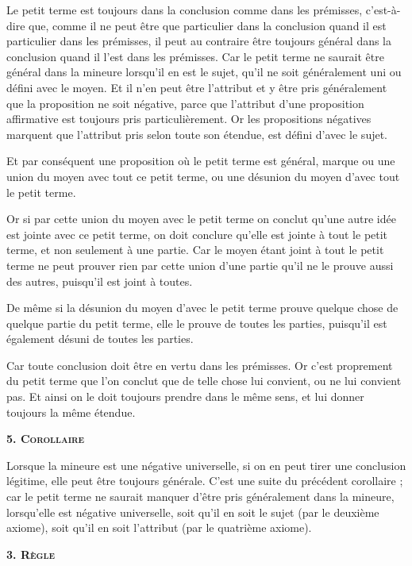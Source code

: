 	Le petit terme est toujours dans la conclusion comme dans les prémisses, c'est-à-dire que, comme il ne peut être que particulier dans la conclusion quand il est particulier dans les prémisses, il peut au contraire être toujours général dans la conclusion quand il l'est dans les prémisses.
	Car le petit terme ne saurait être général dans la mineure lorsqu'il en est le sujet, qu'il ne soit généralement uni ou défini avec le moyen. Et il n'en peut être l'attribut et y être pris généralement que la proposition ne soit négative, parce que l'attribut d'une proposition affirmative est toujours pris particulièrement. Or les propositions négatives marquent que l'attribut pris selon toute son étendue, est défini d'avec le sujet.

	Et par conséquent une proposition où le petit terme est général, marque ou une union du moyen avec tout ce petit terme, ou une désunion du moyen d'avec tout le petit terme.

	Or si par cette union du moyen avec le petit terme on conclut qu'une autre idée est jointe avec ce petit terme, on doit conclure qu'elle est jointe à tout le petit terme, et non seulement à une partie. Car le moyen étant joint à tout le petit terme ne peut prouver rien par cette union d'une partie qu'il ne le prouve aussi des autres, puisqu'il est joint à toutes.

	De même si la désunion du moyen d'avec le petit terme prouve quelque chose de quelque partie du petit terme, elle le prouve de toutes les parties, puisqu'il est également désuni de toutes les parties.

	Car toute conclusion doit être en vertu dans les prémisses. Or c'est proprement du petit terme que l'on conclut que de telle chose lui convient, ou ne lui convient pas. Et ainsi on le doit toujours prendre dans le même sens, et lui donner toujours la même étendue.

\begin{center}{\bfseries\scshape 5. Corollaire}\end{center}

	Lorsque la mineure est une négative universelle, si on en peut tirer une conclusion légitime, elle peut être toujours générale. C'est une suite du précédent corollaire ; car le petit terme ne saurait manquer d'être pris généralement dans la mineure, lorsqu'elle est négative universelle, soit qu'il en soit le sujet (par le deuxième axiome), soit qu'il en soit l'attribut (par le quatrième axiome).

\begin{center}{\bfseries\scshape\large 3. Règle}\end{center}


